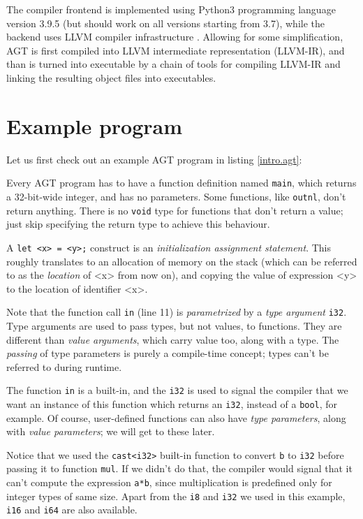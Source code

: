 \documentclass[times, utf8, diplomski]{fer}
\theoremstyle{definition}
\newcommand{\agtcode}[3]{
    
}
\begin{document}
The compiler frontend is implemented using Python3 programming language version 3.9.5 (but should work
on all versions starting from 3.7),
while the backend uses LLVM compiler infrastructure \citep{c_llvm_lattner}.
Allowing for some simplification, AGT is first compiled into LLVM intermediate representation (LLVM-IR),
and than is turned into executable by a chain of tools for compiling LLVM-IR and 
linking the resulting object files into executables.

\section{Example program}

Let us first check out an example AGT program in listing \ref{intro.agt}:

\agtcode{\resdir/programs/intro.agt}{intro.agt}{Example AGT program}

Every AGT program has to have a function definition named \texttt{main}, 
which returns a 32-bit-wide integer,
and has no parameters.
Some functions, like \texttt{outnl}, don't return anything. 
There is no \texttt{void} type for functions that don't return a value;
just skip specifying the return type to achieve this behaviour.

A \texttt{let <x> = <y>;} construct is an \textit{initialization assignment statement}.
This roughly translates to an allocation of memory on the stack (which can be referred
to as the \textit{location} of <x> from now on), and copying the value of expression <y>
to the location of identifier <x>.

Note that the function call \texttt{in} (line 11) is \textit{parametrized} 
by a \textit{type argument} \texttt{i32}.
Type arguments are used to pass types, but not values, to functions. 
They are different than \textit{value arguments}, which carry value too, along with a type.
The \textit{passing} of type parameters is purely a compile-time concept;
types can't be referred to during runtime.


The function \texttt{in} is a built-in, and the \texttt{i32} is used to signal the compiler
that we want an instance of this function which returns an \texttt{i32}, 
instead of a \texttt{bool}, for example. 
Of course, user-defined functions can also have \textit{type parameters}, along with \textit{value parameters};
we will get to these later.

Notice that we used the \texttt{cast<i32>} built-in function to convert \texttt{b} to \texttt{i32}
before passing it to function \texttt{mul}. If we didn't do that, the compiler would signal that it can't
compute the expression \texttt{a*b}, since multiplication is predefined only for integer types of same size.
Apart from the \texttt{i8} and \texttt{i32} we used in this example, \texttt{i16} and \texttt{i64} are also
available.
\end{document}
